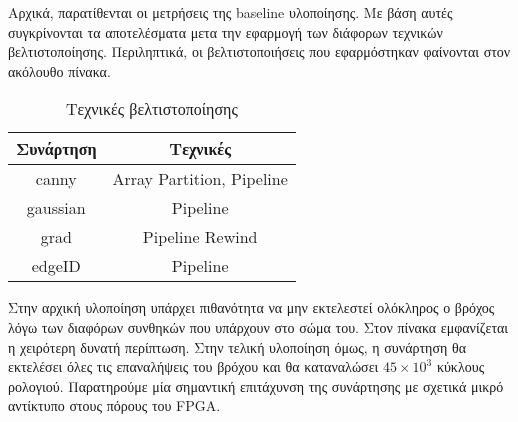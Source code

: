 Αρχικά, παρατίθενται οι μετρήσεις της baseline υλοποίησης. Με βάση αυτές συγκρίνονται τα αποτελέσματα μετα την εφαρμογή των διάφορων τεχνικών βελτιστοποίησης. Περιληπτικά, οι βελτιστοποιήσεις που εφαρμόστηκαν φαίνονται στον ακόλουθο πίνακα.
\begin{table}[H]
\centering
\begin{tabular}{@{}c|c@{}}
\toprule
\textbf{Συνάρτηση} & \textbf{Τεχνικές}         \\ \midrule
canny              & Array Partition, Pipeline \\
gaussian           & Pipeline                  \\
grad               & Pipeline Rewind			\\
edgeID             & Pipeline                  \\ \bottomrule
\end{tabular}
\caption{Τεχνικές βελτιστοποίησης}
\end{table}


Στην αρχική υλοποίηση υπάρχει πιθανότητα να μην εκτελεστεί ολόκληρος ο βρόχος λόγω των διαφόρων συνθηκών που υπάρχουν στο σώμα του. Στον πίνακα εμφανίζεται η χειρότερη δυνατή περίπτωση. Στην τελική υλοποίηση όμως, η συνάρτηση θα εκτελέσει όλες τις επαναλήψεις του βρόχου και θα καταναλώσει $45\times 10^3$ κύκλους ρολογιού. Παρατηρούμε μία σημαντική επιτάχυνση της συνάρτησης με σχετικά μικρό αντίκτυπο στους πόρους του FPGA.

